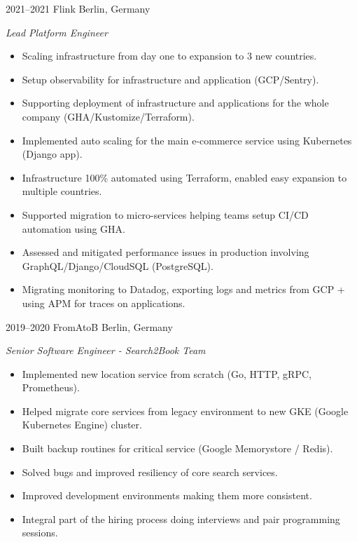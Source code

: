 \documentclass[]{friggeri-cv} %
\begin{document}
\begin{entrylist}
\entry
{2021--2021}
{Flink}
{Berlin, Germany}
{\emph{Lead Platform Engineer} \\

\begin{itemize}
  \item Scaling infrastructure from day one to expansion to 3 new countries.
  \item Setup observability for infrastructure and application (GCP/Sentry).
  \item Supporting deployment of infrastructure and applications for the whole company (GHA/Kustomize/Terraform).
  \item Implemented auto scaling for the main e-commerce service using Kubernetes (Django app).
  \item Infrastructure 100\% automated using Terraform, enabled easy expansion to multiple countries.
  \item Supported migration to micro-services helping teams setup CI/CD automation using GHA.
  \item Assessed and mitigated performance issues in production involving GraphQL/Django/CloudSQL (PostgreSQL).
  \item Migrating monitoring to Datadog, exporting logs and metrics from GCP + using APM for traces on applications.
\end{itemize}

}
\end{entrylist}

\begin{entrylist}
\entry
{2019--2020}
{FromAtoB}
{Berlin, Germany}
{\emph{Senior Software Engineer - Search2Book Team} \\

\begin{itemize}
  \item Implemented new location service from scratch (Go, HTTP, gRPC, Prometheus).
  \item Helped migrate core services from legacy environment to new GKE (Google Kubernetes Engine) cluster.
  \item Built backup routines for critical service (Google Memorystore / Redis).
  \item Solved bugs and improved resiliency of core search services.
  \item Improved development environments making them more consistent.
  \item Integral part of the hiring process doing interviews and pair programming sessions.
\end{itemize}

}
\end{entrylist}
\end{document}
